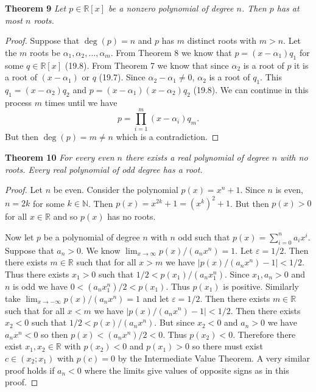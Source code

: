 \documentclass{article}
\begin{document}
\begin{flushleft}
\textbf{Theorem 9}
\textsl{Let $p \in \mathbb{R}[x]$ be a nonzero polynomial of degree $n$. Then $p$ has at most $n$ roots.}
\begin{proof}
Suppose that $\deg(p) = n$ and $p$ has $m$ distinct roots with $m>n$. Let the $m$ roots be $\alpha_1, \alpha_2, \dots ,\alpha_m$. From Theorem 8 we know that $p = (x-\alpha_1)q_1$ for some $q \in \mathbb{R}[x]$ (19.8). From Theorem 7 we know that since $\alpha_2$ is a root of $p$ it is a root of $(x-\alpha_1)$ or $q$ (19.7). Since $\alpha_2-\alpha_1 \neq 0$, $\alpha_2$ is a root of $q_1$. This $q_1 = (x-\alpha_2)q_2$ and $p = (x-\alpha_1)(x-\alpha_2)q_2$ (19.8). We can continue in this process $m$ times until we have
\[
p = \prod_{i=1}^m (x-\alpha_i) q_m.
\]
But then $\deg(p) = m \neq n$ which is a contradiction.
\end{proof}

\textbf{Theorem 10}
\textsl{For every even $n$ there exists a real polynomial of degree $n$ with no roots. Every real polynomial of odd degree has a root.}
\begin{proof}
Let $n$ be even. Consider the polynomial $p(x)=x^n+1$. Since $n$ is even, $n=2k$ for some $k \in \mathbb{N}$. Then $p(x)=x^{2k}+1=(x^k)^2+1$. But then $p(x) > 0$ for all $x \in \mathbb{R}$ and so $p(x)$ has no roots.\newline

Now let $p$ be a polynomial of degree $n$ with $n$ odd such that $p(x) = \sum_{i=0}^n a_i x^i$. Suppose that $a_n > 0$. We know $\lim_{x \rightarrow \infty} p(x)/(a_n x^n) = 1$. Let $\varepsilon = 1/2$. Then there exists $m \in \mathbb{R}$ such that for all $x > m$ we have $|p(x)/(a_n x^n) - 1| < 1/2$. Thus there exists $x_1>0$ such that $1/2 < p(x_1)/(a_n x_1^n)$. Since $x_1, a_n > 0$ and $n$ is odd we have $0 < (a_n x_1^n)/2 < p(x_1)$. Thus $p(x_1)$ is positive. Similarly take $\lim_{x \rightarrow -\infty} p(x)/(a_n x^n) = 1$ and let $\varepsilon = 1/2$. Then there exists $m \in \mathbb{R}$ such that for all $x<m$ we have $|p(x)/(a_n x^n)-1| < 1/2$. Then there exists $x_2 < 0$ such that $1/2 < p(x)/(a_n x^n)$. But since $x_2 < 0$ and $a_n > 0$ we have $a_n x^n < 0$ so then $p(x) < (a_n x^n)/2 < 0$. Thus $p(x_2) < 0$. Therefore there exist $x_1,x_2 \in \mathbb{R}$ with $p(x_2) < 0$ and $p(x_1) > 0$ so there must exist $c \in (x_2;x_1)$ with $p(c) = 0$ by the Intermediate Value Theorem. A very similar proof holds if $a_n < 0$ where the limits give values of opposite signs as in this proof.
\end{proof}


\end{flushleft}
\end{document}
